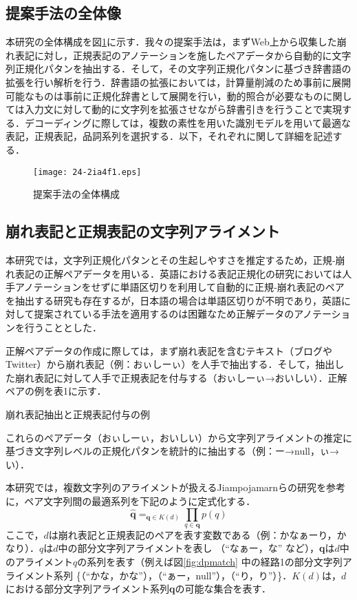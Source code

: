 \documentclass[japanese]{jnlp_1.4}
\newcommand{\argmax}{}
\begin{document}
\subsection{提案手法の全体像}

本研究の全体構成を図\ref{fig:systemall}に示す．我々の提案手法は，まずWeb上から収集した崩れ表記に対し，正規表記のアノテーションを施したペアデータから自動的に文字列正規化パタンを抽出する．そして，その文字列正規化パタンに基づき辞書語の拡張を行い解析を行う．辞書語の拡張においては，計算量削減のため事前に展開可能なものは事前に正規化辞書として展開を行い，動的照合が必要なものに関しては入力文に対して動的に文字列を拡張させながら辞書引きを行うことで実現する．デコーディングに際しては，複数の素性を用いた識別モデルを用いて最適な表記，正規表記，品詞系列を選択する．以下，それぞれに関して詳細を記述する．

\begin{figure}[t]
\begin{center}
\texttt{[image: 24-2ia4f1.eps]}
\end{center}
\caption{提案手法の全体構成}
\label{fig:systemall}
\end{figure}


\subsection{崩れ表記と正規表記の文字列アライメント}

本研究では，文字列正規化パタンとその生起しやすさを推定するため，正規‐崩れ表記の正解ペアデータを用いる．英語における表記正規化の研究\cite{yang-eisenstein:2013:EMNLP}においては人手アノテーションをせずに単語区切りを利用して自動的に正規‐崩れ表記のペアを抽出する研究も存在するが，日本語の場合は単語区切りが不明であり，英語に対して提案されている手法を適用するのは困難なため正解データのアノテーションを行うこととした．

正解ペアデータの作成に際しては，まず崩れ表記を含むテキスト（ブログやTwitter）から崩れ表記（例：おぃしーぃ）を人手で抽出する．そして，抽出した崩れ表記に対して人手で正規表記を付与する（おぃしーぃ→おいしい）．正解ペアの例を表1に示す．

\begin{table}[t]
\caption{崩れ表記抽出と正規表記付与の例}

\end{table}

これらのペアデータ（おぃしーぃ，おいしい）から文字列アライメントの推定に基づき文字列レベルの正規化パタンを統計的に抽出する（例：ー→null，ぃ→い）．

本研究では，複数文字列のアライメントが扱えるJiampojamarnらの研究\cite{jiampojamarn-kondrak-sherif:2007:main}を参考に，ペア文字列間の最適系列を下記のように定式化する．
\begin{equation}
\mathbf{\hat{q}} = \argmax_{\mathbf{q} \in K(d)} \prod_{q \in \mathbf{q}}p(q)
\end{equation}
ここで，$d$は崩れ表記と正規表記のペアを表す変数である（例：かなぁーり，かなり）．$q$は$d$中の部分文字列アライメントを表し （``なぁー，な'' など），{\bf q}は$d$中のアライメント$q$の系列を表す（例えば図\ref{fig:dpmatch} 中の経路1の部分文字列アライメント系列 \{（``かな，かな''），（``ぁー，null''），（``り，り''）\}．$K(d)$は，$d$における部分文字列アライメント系列{\bf q}の可能な集合を表す．
\end{document}
